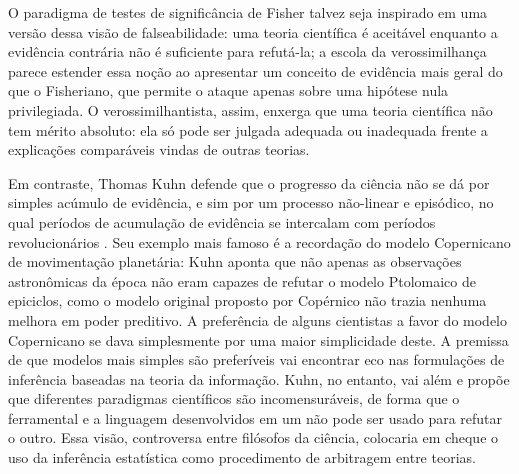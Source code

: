 O paradigma de testes de significância de Fisher talvez seja inspirado em uma versão dessa visão de falseabilidade: uma
teoria científica é aceitável enquanto a evidência contrária não é
suficiente para refutá-la; 
a escola da verossimilhança
parece estender essa noção ao apresentar um conceito de evidência mais geral do que o Fisheriano, que permite o ataque apenas
sobre uma hipótese nula privilegiada. O verossimilhantista, assim, enxerga que uma teoria científica não tem mérito absoluto:
ela só pode ser julgada adequada ou inadequada frente a explicações comparáveis vindas de outras teorias.

Em contraste, Thomas Kuhn defende que o progresso da ciência não se dá por
simples acúmulo de evidência, e sim por um processo não-linear e episódico, no qual períodos de acumulação de evidência se
intercalam com períodos revolucionários \citep{Kuhn62}. 
Seu exemplo mais famoso é a recordação do modelo Copernicano de movimentação planetária:
Kuhn aponta que não apenas as observações astronômicas da época não eram capazes de refutar o modelo Ptolomaico de epiciclos,
como o modelo original proposto por Copérnico não trazia nenhuma melhora em poder preditivo. A preferência de alguns cientistas
a favor do modelo Copernicano se dava simplesmente por uma maior simplicidade deste. A premissa de que modelos mais simples
são preferíveis vai encontrar eco nas formulações de inferência baseadas na teoria da informação. Kuhn, no entanto, vai além
e propõe que diferentes paradigmas científicos são incomensuráveis, de forma que o ferramental e a linguagem desenvolvidos
em um não pode ser usado para refutar o outro. Essa visão, controversa entre filósofos da ciência, colocaria em cheque o uso da
inferência estatística como procedimento de arbitragem entre teorias.

